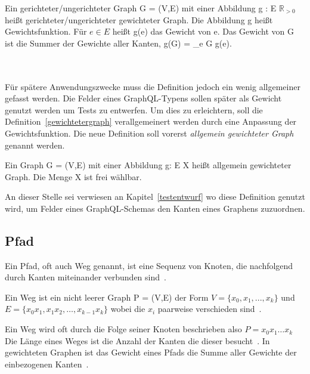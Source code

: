 \begin{definition}
    Ein gerichteter/ungerichteter Graph G = (V,E) mit einer Abbildung g : E \textrightarrow $\mathbb{R}_{>0}$ heißt gerichteter/ungerichteter gewichteter Graph.
    Die Abbildung g heißt Gewichtsfunktion. Für $e \in E$ heißt g(e) das Gewicht von e.
    Das Gewicht von G ist die Summer der Gewichte aller Kanten, g(G) = \sum_{e \in G} g(e).\\
    \cite[vgl.~Definition~6.1~S.~251]{graphentheorie3}
    \label{gewichtetergraph}
\end{definition}
\\
\\
Für spätere Anwendungszwecke muss die Definition jedoch ein wenig allgemeiner gefasst werden.
Die Felder eines GraphQL-Typens sollen später als Gewicht genutzt werden um Tests zu entwerfen.
Um dies zu erleichtern, soll die Definition~\ref{gewichtetergraph} verallgemeinert werden durch eine Anpassung der Gewichtsfunktion.
Die neue Definition soll vorerst \textit{allgemein gewichteter Graph} genannt werden.

\begin{definition}
    Ein Graph G = (V,E) mit einer Abbildung g: E \textrightarrow X heißt allgemein gewichteter Graph.
    Die Menge X ist frei wählbar.
    \label{allgemeingewichtetergraph}
\end{definition}
An dieser Stelle sei verwiesen an Kapitel~\ref{testentwurf} wo diese Definition genutzt wird,
um Felder eines  GraphQL-Schemas den Kanten eines Graphens zuzuordnen.

\subsection{Pfad}
\label{pfad}

Ein Pfad, oft auch Weg genannt, ist eine Sequenz von Knoten, die nachfolgend durch Kanten miteinander verbunden sind~\cite[vgl. S. 7 0.3]{graphentheorie}.

\begin{definition}
    Ein Weg ist ein nicht leerer Graph P = (V,E) der Form $V = \{x_{0}, x_{1}, ..., x_{k}\}$ und $E = \{x_{0}x_{1}, x_{1}x_{2}, \ldots, x_{k-1}x_{k}\}$ wobei die $x_{i}$
    paarweise verschieden sind~\cite[vgl. S. 7]{graphentheorie}.
\end{definition}

Ein Weg wird oft durch die Folge seiner Knoten beschrieben also $P=x_{0} x_{1} \ldots x_{k}$ \cite[vgl. S.7]{graphentheorie}
Die Länge eines Weges ist die Anzahl der Kanten die dieser besucht~\cite[vgl. S. 7]{graphentheorie}.
In gewichteten Graphen ist das Gewicht eines Pfads die Summe aller Gewichte der einbezogenen Kanten~\cite[vgl. 7.2 kürzeste Wege]{graphentheorie3}.

